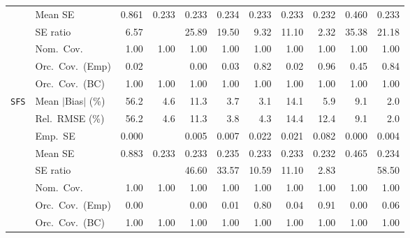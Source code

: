 \begin{landscape}
\begin{longtable}{llrrrrrrrrr}
 & Mean SE & 0.861 & 0.233 & 0.233 & 0.234 & 0.233 & 0.233 & 0.232 & 0.460 & 0.233 \\
 & SE ratio & \cellcolor{ranktwo}6.57 &  & 25.89 & 19.50 & \cellcolor{rankthree}9.32 & 11.10 & \cellcolor{rankone}2.32 & 35.38 & 21.18 \\
 & Nom.\ Cov. & \cellcolor{rankone}1.00 & \cellcolor{rankone}1.00 & \cellcolor{rankone}1.00 & \cellcolor{rankone}1.00 & \cellcolor{rankone}1.00 & \cellcolor{rankone}1.00 & \cellcolor{rankone}1.00 & \cellcolor{rankone}1.00 & \cellcolor{rankone}1.00 \\
 & Orc.\ Cov.\ (Emp) & 0.02 &  & 0.00 & 0.03 & \cellcolor{rankthree}0.82 & 0.02 & \cellcolor{rankone}0.96 & 0.45 & \cellcolor{ranktwo}0.84 \\
 & Orc.\ Cov.\ (BC) & \cellcolor{rankone}1.00 & \cellcolor{rankone}1.00 & \cellcolor{rankone}1.00 & \cellcolor{rankone}1.00 & \cellcolor{rankone}1.00 & \cellcolor{rankone}1.00 & \cellcolor{rankone}1.00 & \cellcolor{rankone}1.00 & \cellcolor{rankone}1.00 \\
\addlinespace[2pt]
\quad \texttt{SFS} & Mean $|$Bias$|$ (\%) & 56.2 & 4.6 & 11.3 & \cellcolor{rankthree}3.7 & \cellcolor{ranktwo}3.1 & 14.1 & 5.9 & 9.1 & \cellcolor{rankone}2.0 \\
 & Rel.\ RMSE (\%) & 56.2 & 4.6 & 11.3 & \cellcolor{ranktwo}3.8 & \cellcolor{rankthree}4.3 & 14.4 & 12.4 & 9.1 & \cellcolor{rankone}2.0 \\
 & Emp.\ SE & 0.000 &  & 0.005 & 0.007 & 0.022 & 0.021 & 0.082 & 0.000 & 0.004 \\
 & Mean SE & 0.883 & 0.233 & 0.233 & 0.235 & 0.233 & 0.233 & 0.232 & 0.465 & 0.234 \\
 & SE ratio &  &  & 46.60 & 33.57 & \cellcolor{ranktwo}10.59 & \cellcolor{rankthree}11.10 & \cellcolor{rankone}2.83 &  & 58.50 \\
 & Nom.\ Cov. & \cellcolor{rankone}1.00 & \cellcolor{rankone}1.00 & \cellcolor{rankone}1.00 & \cellcolor{rankone}1.00 & \cellcolor{rankone}1.00 & \cellcolor{rankone}1.00 & \cellcolor{rankone}1.00 & \cellcolor{rankone}1.00 & \cellcolor{rankone}1.00 \\
 & Orc.\ Cov.\ (Emp) & 0.00 &  & 0.00 & 0.01 & \cellcolor{ranktwo}0.80 & 0.04 & \cellcolor{rankone}0.91 & 0.00 & \cellcolor{rankthree}0.06 \\
 & Orc.\ Cov.\ (BC) & \cellcolor{rankone}1.00 & \cellcolor{rankone}1.00 & \cellcolor{rankone}1.00 & \cellcolor{rankone}1.00 & \cellcolor{rankone}1.00 & \cellcolor{rankone}1.00 & \cellcolor{rankone}1.00 & \cellcolor{rankone}1.00 & \cellcolor{rankone}1.00 \\

\end{longtable}
\end{landscape}
